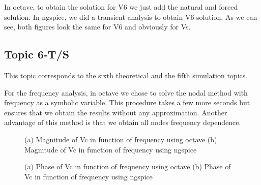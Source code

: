 In octave, to obtain the solution for V6 we just add the natural and forced solution. In ngspice, we did a transient analysis to obtain V6 solution.
As we can see, both figures look the same for V6 and obviously for Vs.




\subsection {Topic 6-T/S}
This topic corresponds to the sixth theoretical and the fifth simulation topics.

For the frequency analysis, in octave we chose to solve the nodal method with frequency as a symbolic variable. 
This procedure takes a few more seconds but ensures that we obtain the results without any approximation.
Another advantage of this method is that we obtain all nodes frequency dependence.

\begin{figure}[h!]
            \centering
            \caption{(a) Magnitude of Vc in function of frequency using octave (b) Magnitude of Vc in function of frequency using ngspice}
            \label{fig:icere}
\end{figure}
\begin{figure}[h!]
            \centering
            \caption{(a) Phase of Vc in function of frequency using octave (b) Phase of Vc in function of frequency using ngspice}
            \label{fig:iceer}
\end{figure}

